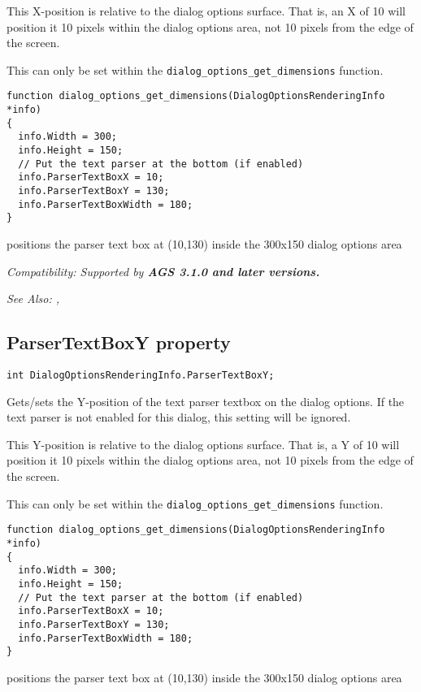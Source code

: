 This X-position is relative to the dialog options surface. That is, an X of 10
will position it 10 pixels within the dialog options area, not 10 pixels from
the edge of the screen.

This can only be set within the \verb$dialog_options_get_dimensions$ function.

\begin{verbatim}
function dialog_options_get_dimensions(DialogOptionsRenderingInfo *info)
{
  info.Width = 300;
  info.Height = 150;
  // Put the text parser at the bottom (if enabled)
  info.ParserTextBoxX = 10;
  info.ParserTextBoxY = 130;
  info.ParserTextBoxWidth = 180;
}
\end{verbatim}
positions the parser text box at (10,130) inside the 300x150 dialog options area

\it{Compatibility:} Supported by \bf{AGS 3.1.0} and later versions.

\it{See Also:} ,


\subsection{ParserTextBoxY property}\label{DialogOptionsRenderingInfo.ParserTextBoxY}%

\begin{verbatim}
int DialogOptionsRenderingInfo.ParserTextBoxY;
\end{verbatim}
Gets/sets the Y-position of the text parser textbox on the dialog options.
If the text parser is not enabled for this dialog, this setting will be ignored.

This Y-position is relative to the dialog options surface. That is, a Y of 10
will position it 10 pixels within the dialog options area, not 10 pixels from
the edge of the screen.

This can only be set within the \verb$dialog_options_get_dimensions$ function.

\begin{verbatim}
function dialog_options_get_dimensions(DialogOptionsRenderingInfo *info)
{
  info.Width = 300;
  info.Height = 150;
  // Put the text parser at the bottom (if enabled)
  info.ParserTextBoxX = 10;
  info.ParserTextBoxY = 130;
  info.ParserTextBoxWidth = 180;
}
\end{verbatim}
positions the parser text box at (10,130) inside the 300x150 dialog options area

